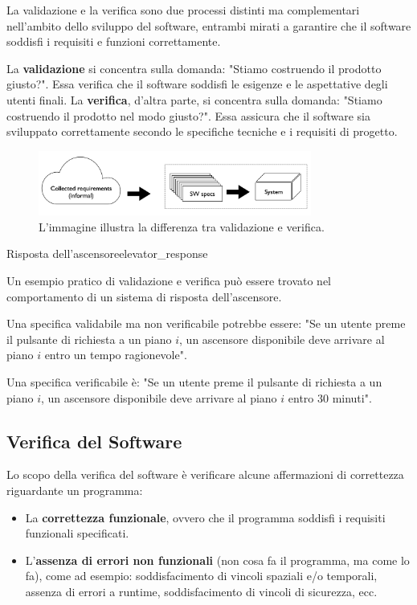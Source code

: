 La validazione e la verifica sono due processi distinti ma complementari
nell'ambito dello sviluppo del software, entrambi mirati a garantire che
il software soddisfi i requisiti e funzioni correttamente.


La \textbf{validazione} si concentra sulla domanda: "Stiamo costruendo il
prodotto giusto?".
Essa verifica che il software soddisfi le esigenze e le aspettative degli
utenti finali.
La \textbf{verifica}, d'altra parte, si concentra sulla domanda: "Stiamo
costruendo il prodotto nel modo giusto?".
Essa assicura che il software sia sviluppato correttamente secondo le
specifiche tecniche e i requisiti di progetto.


\begin{figure}[H]
    \centering
    \includegraphics[width=0.8\textwidth]{images/th_01/01.png}
    \caption{L'immagine illustra la differenza tra validazione e verifica.}
    \label{fig:th_01_01}
\end{figure}

\begin{esempio}{Risposta dell'ascensore}{elevator_response}

Un esempio pratico di validazione e verifica può essere trovato nel
comportamento di un sistema di risposta dell'ascensore.

Una specifica validabile ma non verificabile potrebbe essere:
"Se un utente preme il pulsante di richiesta a un piano $i$, un ascensore
disponibile deve arrivare al piano $i$ entro un tempo ragionevole".

Una specifica verificabile è:
"Se un utente preme il pulsante di richiesta a un piano $i$, un ascensore
disponibile deve arrivare al piano $i$ entro 30 minuti".

\end{esempio}

\subsection{Verifica del Software}

Lo scopo della verifica del software è verificare alcune affermazioni di
correttezza riguardante un programma:
\begin{itemize}
    \item La \textbf{correttezza funzionale}, ovvero che il programma
    soddisfi i requisiti funzionali specificati.
    \item L'\textbf{assenza di errori non funzionali} (non cosa fa il
    programma, ma come lo fa), come ad esempio: soddisfacimento di vincoli
    spaziali e/o temporali, assenza di errori a runtime, soddisfacimento di
    vincoli di sicurezza, ecc.
\end{itemize}

